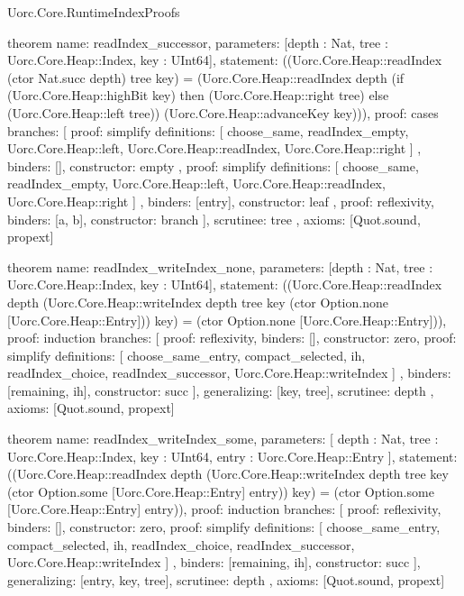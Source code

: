 \begin{lexlean}{Uorc.Core.RuntimeIndexProofs}
\begin{semanticmodule}
theorem{
  name: readIndex_successor,
  parameters: [depth : Nat, tree : Uorc.Core.Heap::Index, key : UInt64],
  statement: ((Uorc.Core.Heap::readIndex (ctor Nat.succ depth) tree key) = (Uorc.Core.Heap::readIndex depth (if (Uorc.Core.Heap::highBit key) then (Uorc.Core.Heap::right tree) else (Uorc.Core.Heap::left tree)) (Uorc.Core.Heap::advanceKey key))),
  proof: cases{
    branches: [
      {
        proof: simplify{
          definitions: [
            choose_same,
            readIndex_empty,
            Uorc.Core.Heap::left,
            Uorc.Core.Heap::readIndex,
            Uorc.Core.Heap::right
          ]
        },
        binders: [],
        constructor: empty
      },
      {
        proof: simplify{
          definitions: [
            choose_same,
            readIndex_empty,
            Uorc.Core.Heap::left,
            Uorc.Core.Heap::readIndex,
            Uorc.Core.Heap::right
          ]
        },
        binders: [entry],
        constructor: leaf
      },
      {proof: reflexivity{}, binders: [a, b], constructor: branch}
    ],
    scrutinee: tree
  },
  axioms: [Quot.sound, propext]
}

theorem{
  name: readIndex_writeIndex_none,
  parameters: [depth : Nat, tree : Uorc.Core.Heap::Index, key : UInt64],
  statement: ((Uorc.Core.Heap::readIndex depth (Uorc.Core.Heap::writeIndex depth tree key (ctor Option.none [Uorc.Core.Heap::Entry])) key) = (ctor Option.none [Uorc.Core.Heap::Entry])),
  proof: induction{
    branches: [
      {proof: reflexivity{}, binders: [], constructor: zero},
      {
        proof: simplify{
          definitions: [
            choose_same_entry,
            compact_selected,
            ih,
            readIndex_choice,
            readIndex_successor,
            Uorc.Core.Heap::writeIndex
          ]
        },
        binders: [remaining, ih],
        constructor: succ
      }
    ],
    generalizing: [key, tree],
    scrutinee: depth
  },
  axioms: [Quot.sound, propext]
}

theorem{
  name: readIndex_writeIndex_some,
  parameters: [
    depth : Nat,
    tree : Uorc.Core.Heap::Index,
    key : UInt64,
    entry : Uorc.Core.Heap::Entry
  ],
  statement: ((Uorc.Core.Heap::readIndex depth (Uorc.Core.Heap::writeIndex depth tree key (ctor Option.some [Uorc.Core.Heap::Entry] entry)) key) = (ctor Option.some [Uorc.Core.Heap::Entry] entry)),
  proof: induction{
    branches: [
      {proof: reflexivity{}, binders: [], constructor: zero},
      {
        proof: simplify{
          definitions: [
            choose_same_entry,
            compact_selected,
            ih,
            readIndex_choice,
            readIndex_successor,
            Uorc.Core.Heap::writeIndex
          ]
        },
        binders: [remaining, ih],
        constructor: succ
      }
    ],
    generalizing: [entry, key, tree],
    scrutinee: depth
  },
  axioms: [Quot.sound, propext]
}
\end{semanticmodule}
\end{lexlean}
